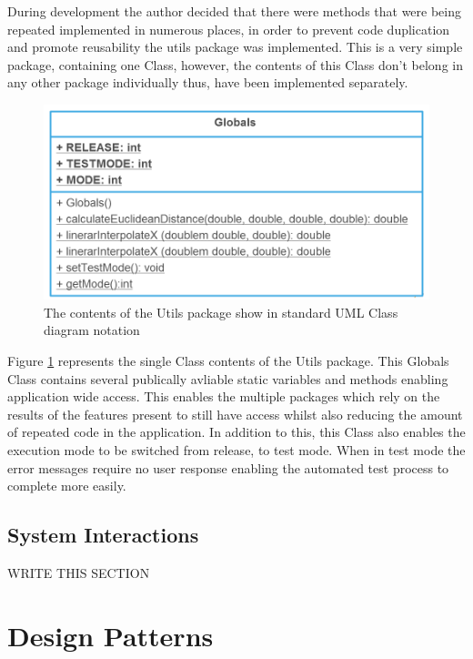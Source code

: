 During development the author decided that there were methods that were being repeated implemented in numerous places, in order to prevent code duplication and promote reusability the utils package was implemented. This is a very simple package, containing one Class, however, the contents of this Class don't belong in any other package individually thus, have been implemented separately.

\begin{figure}[H]
\centering
\includegraphics[scale=0.3]{Images/chapter4/gloabls}
\caption{The contents of the Utils package show in standard UML Class diagram notation}
\label{fig:utilsImp}
\end{figure}

Figure \ref{fig:utilsImp} represents the single Class contents of the Utils package. This Globals Class contains several publically avliable static variables and methods enabling application wide access. This enables the multiple packages which rely on the results of the features present to still have access whilst also reducing the amount of repeated code in the application. In addition to this, this Class also enables the execution mode to be switched from release, to test mode. When in test mode the error messages require no user response enabling the automated test process to complete more easily.

\subsection{System Interactions}

\Large WRITE THIS SECTION \normalsize

\section{Design Patterns}

